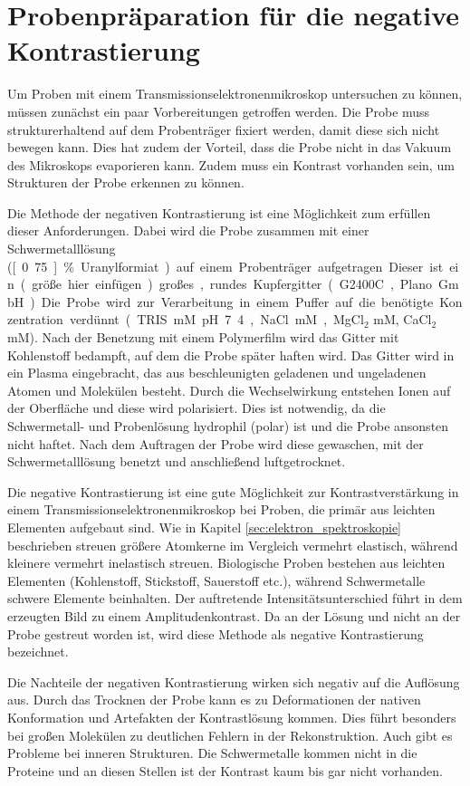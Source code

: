 \section{Probenpräparation für die negative Kontrastierung} %
\label{sec:probenpr_aparation_mit_negativer_kontrastierung}

Um Proben mit einem Transmissionselektronenmikroskop untersuchen zu können, müssen zunächst ein paar Vorbereitungen getroffen werden.
Die Probe muss strukturerhaltend auf dem Probenträger fixiert werden, damit diese sich nicht bewegen kann.
Dies hat zudem der Vorteil, dass die Probe nicht in das Vakuum des Mikroskops evaporieren kann.
Zudem muss ein Kontrast vorhanden sein, um Strukturen der Probe erkennen zu können.

Die Methode der negativen Kontrastierung ist eine Möglichkeit zum erfüllen dieser Anforderungen.
Dabei wird die Probe zusammen mit einer Schwermetalllösung (\unit[0.75]{\%} Uranylformiat) auf einem Probenträger aufgetragen.
Dieser ist ein (größe hier einfügen) großes, rundes Kupfergitter (G2400C, Plano GmbH).
Die Probe wird zur Verarbeitung in einem Puffer auf die benötigte Konzentration verdünnt (TRIS \unit[50]{mM} pH 7.4, NaCl \unit[150]{mM}, MgCl$_2$ \unit[5]{mM}, CaCl$_2$ \unit[5]{mM}).
Nach der Benetzung mit einem Polymerfilm wird das Gitter mit Kohlenstoff bedampft, auf dem die Probe später haften wird.
Das Gitter wird in ein Plasma eingebracht, das aus beschleunigten geladenen und ungeladenen Atomen und Molekülen besteht.
Durch die Wechselwirkung entstehen Ionen auf der Oberfläche und diese wird polarisiert.
Dies ist notwendig, da die Schwermetall- und Probenlösung hydrophil (polar) ist und die Probe ansonsten nicht haftet.
Nach dem Auftragen der Probe wird diese gewaschen, mit der Schwermetalllösung benetzt und anschließend luftgetrocknet.

Die negative Kontrastierung ist eine gute Möglichkeit zur Kontrastverstärkung in einem Transmissionselektronenmikroskop bei Proben, die primär aus leichten Elementen aufgebaut sind.
Wie in Kapitel \ref{sec:elektron_spektroskopie} beschrieben streuen größere Atomkerne im Vergleich vermehrt elastisch, während kleinere vermehrt inelastisch streuen.
Biologische Proben bestehen aus leichten Elementen (Kohlenstoff, Stickstoff, Sauerstoff etc.), während Schwermetalle schwere Elemente beinhalten.
Der auftretende Intensitätsunterschied führt in dem erzeugten Bild zu einem Amplitudenkontrast.
Da an der Lösung und nicht an der Probe gestreut worden ist, wird diese Methode als negative Kontrastierung bezeichnet.

Die Nachteile der negativen Kontrastierung wirken sich negativ auf die Auflösung aus.
Durch das Trocknen der Probe kann es zu Deformationen der nativen Konformation und Artefakten der Kontrastlösung kommen.
Dies führt besonders bei großen Molekülen zu deutlichen Fehlern in der Rekonstruktion.
Auch gibt es Probleme bei inneren Strukturen. 
Die Schwermetalle kommen nicht in die Proteine und an diesen Stellen ist der Kontrast kaum bis gar nicht vorhanden.

\FloatBarrier